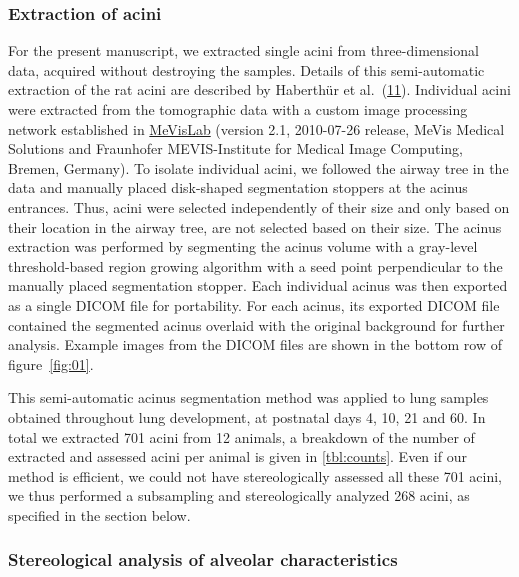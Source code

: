 \documentclass[
  american,
]{article}
\begin{document}
\hypertarget{extraction-of-acini}{%
\subsubsection{Extraction of acini}\label{extraction-of-acini}}

For the present manuscript, we extracted single acini from three-dimensional data, acquired without destroying the samples.
Details of this semi-automatic extraction of the rat acini are described by Haberthür et al.~(\protect\hyperlink{ref-7YLeeyu}{11}).
Individual acini were extracted from the tomographic data with a custom image processing network established in \href{https://www.mevislab.de/}{MeVisLab} (version 2.1, 2010-07-26 release, MeVis Medical Solutions and Fraunhofer MEVIS-Institute for Medical Image Computing, Bremen, Germany).
To isolate individual acini, we followed the airway tree in the data and manually placed disk-shaped segmentation stoppers at the acinus entrances.
Thus, acini were selected independently of their size and only based on their location in the airway tree, are not selected based on their size.
The acinus extraction was performed by segmenting the acinus volume with a gray-level threshold-based region growing algorithm with a seed point perpendicular to the manually placed segmentation stopper.
Each individual acinus was then exported as a single DICOM file for portability.
For each acinus, its exported DICOM file contained the segmented acinus overlaid with the original background for further analysis.
Example images from the DICOM files are shown in the bottom row of figure~\ref{fig:01}.

This semi-automatic acinus segmentation method was applied to lung samples obtained throughout lung development, at postnatal days 4, 10, 21 and 60.
In total we extracted 701 acini from 12 animals, a breakdown of the number of extracted and assessed acini per animal is given in \ref{tbl:counts}.
Even if our method is efficient, we could not have stereologically assessed all these 701 acini, we thus performed a subsampling and stereologically analyzed 268 acini, as specified in the section below.

\hypertarget{stereological-analysis-of-alveolar-characteristics}{%
\subsubsection{Stereological analysis of alveolar characteristics}\label{stereological-analysis-of-alveolar-characteristics}}
\end{document}

